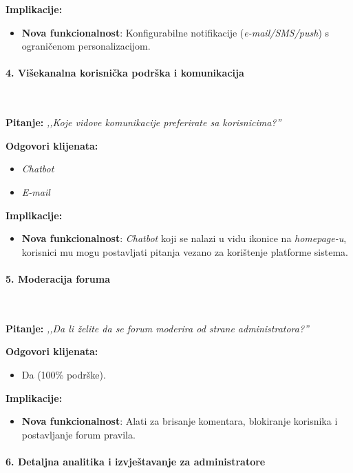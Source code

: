 \textbf{Implikacije:}  
\begin{itemize}  
    \item \textbf{Nova funkcionalnost}: Konfigurabilne notifikacije (\emph{e-mail/SMS/push}) s ograničenom personalizacijom.  
\end{itemize}  

\paragraph*{4. Višekanalna korisnička podrška i komunikacija}~


\textbf{Pitanje:}  
\emph{,,Koje vidove komunikacije preferirate sa korisnicima?''}  

\textbf{Odgovori klijenata:}  
\begin{itemize}  
    \item \emph{Chatbot}  
    \item \emph{E-mail}  
\end{itemize}  

\textbf{Implikacije:}  
\begin{itemize}  
    \item \textbf{Nova funkcionalnost}: \emph{Chatbot} koji se nalazi u vidu ikonice na \emph{homepage-u}, korisnici mu mogu postavljati pitanja vezano za korištenje platforme sistema.  
\end{itemize}  

\paragraph*{5. Moderacija foruma}~


\textbf{Pitanje:}  
\emph{,,Da li želite da se forum moderira od strane administratora?''}  

\textbf{Odgovori klijenata:}  
\begin{itemize}  
    \item Da (100\% podrške).  
\end{itemize}  

\textbf{Implikacije:}  
\begin{itemize}  
    \item \textbf{Nova funkcionalnost}: Alati za brisanje komentara, blokiranje korisnika i postavljanje forum pravila.  
\end{itemize}  

\paragraph*{6. Detaljna analitika i izvještavanje za administratore}~


